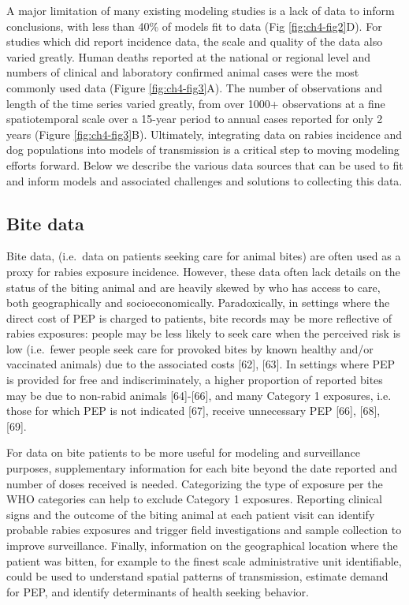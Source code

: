 \documentclass[
  oneside]{book}
\begin{document}
A major limitation of many existing modeling studies is a lack of data
to inform conclusions, with less than 40\% of models fit to data (Fig \ref{fig:ch4-fig2}D). For studies which did report incidence data, the scale and
quality of the data also varied greatly. Human deaths reported at the
national or regional level and numbers of clinical and laboratory
confirmed animal cases were the most commonly used data (Figure \ref{fig:ch4-fig3}A).
The number of observations and length of the time series varied greatly,
from over 1000+ observations at a fine spatiotemporal scale over a
15-year period to annual cases reported for only 2 years (Figure \ref{fig:ch4-fig3}B).
Ultimately, integrating data on rabies incidence and dog populations
into models of transmission is a critical step to moving modeling
efforts forward. Below we describe the various data sources that can be
used to fit and inform models and associated challenges and solutions to
collecting this data.

\hypertarget{bite-data}{%
\subsection{Bite data}\label{bite-data}}

Bite data, (i.e.~data on patients seeking care for animal bites) are
often used as a proxy for rabies exposure incidence. However, these data
often lack details on the status of the biting animal and are heavily
skewed by who has access to care, both geographically and
socioeconomically. Paradoxically, in settings where the direct cost of
PEP is charged to patients, bite records may be more reflective of
rabies exposures: people may be less likely to seek care when the
perceived risk is low (i.e.~fewer people seek care for provoked bites by
known healthy and/or vaccinated animals) due to the associated costs
{[}62{]}, {[}63{]}. In settings where PEP is provided for free and
indiscriminately, a higher proportion of reported bites may be due to
non-rabid animals {[}64{]}-{[}66{]}, and many Category 1 exposures, i.e.
those for which PEP is not indicated {[}67{]}, receive unnecessary PEP
{[}66{]}, {[}68{]}, {[}69{]}.

For data on bite patients to be more useful for modeling and
surveillance purposes, supplementary information for each bite beyond
the date reported and number of doses received is needed. Categorizing
the type of exposure per the WHO categories can help to exclude Category
1 exposures. Reporting clinical signs and the outcome of the biting
animal at each patient visit can identify probable rabies exposures and
trigger field investigations and sample collection to improve
surveillance. Finally, information on the geographical location where
the patient was bitten, for example to the finest scale administrative
unit identifiable, could be used to understand spatial patterns of
transmission, estimate demand for PEP, and identify determinants of
health seeking behavior.
\end{document}
